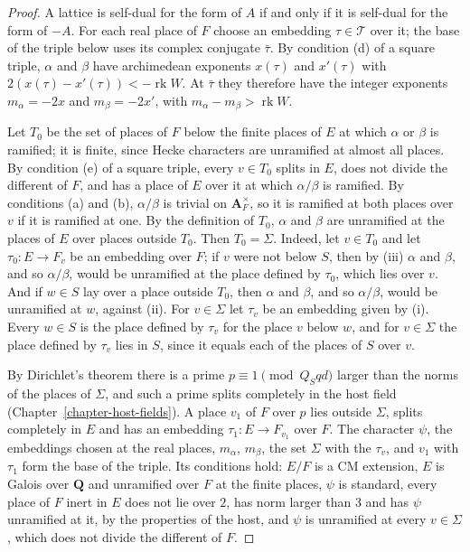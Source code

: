 \begin{proof}
A lattice is self-dual for the form of $A$ if and only if it is self-dual for
the form of $-A$. For each real place of $F$ choose an embedding
$\tau\in\mathcal T$ over it; the base of the triple below uses its complex
conjugate $\bar\tau$. By condition (d) of a square triple, $\alpha$ and $\beta$
have archimedean exponents $x(\tau)$ and $x'(\tau)$ with
$2(x(\tau)-x'(\tau))<-\operatorname{rk}W$. At $\bar\tau$ they therefore have
the integer exponents $m_\alpha=-2x$ and $m_\beta=-2x'$, with
$m_\alpha-m_\beta>\operatorname{rk}W$.

Let $T_0$ be the set of places of $F$ below the finite places of $E$ at which
$\alpha$ or $\beta$ is ramified; it is finite, since Hecke characters are
unramified at almost all places. By condition (e) of a square triple, every
$v\in T_0$ splits in $E$, does not divide the different of $F$, and has a
place of $E$ over it at which $\alpha/\beta$ is ramified. By conditions (a) and
(b), $\alpha/\beta$ is trivial on $\mathbf A_F^\times$, so it is ramified at
both places over $v$ if it is ramified at one. By the definition of $T_0$,
$\alpha$ and $\beta$ are unramified at the places of $E$ over places outside
$T_0$. Then $T_0=\Sigma$. Indeed, let $v\in T_0$ and let $\tau_0\colon E\to F_v$
be an embedding over $F$; if $v$ were not below $S$, then by (iii) $\alpha$ and
$\beta$, and so $\alpha/\beta$, would be unramified at the place defined by
$\tau_0$, which lies over $v$. And if $w\in S$ lay over a place outside $T_0$,
then $\alpha$ and $\beta$, and so $\alpha/\beta$, would be unramified at $w$,
against (ii). For $v\in\Sigma$ let $\tau_v$ be an embedding given by (i). Every
$w\in S$ is the place defined by $\tau_v$ for the place $v$ below $w$, and for
$v\in\Sigma$ the place defined by $\tau_v$ lies in $S$, since it equals each of
the places of $S$ over $v$.

By Dirichlet's theorem there is a prime $p\equiv1\pmod{Q_Sqd}$ larger than the
norms of the places of $\Sigma$, and such a prime splits completely in the host
field (Chapter~\ref{chapter-host-fields}). A place $v_1$ of $F$ over $p$ lies
outside $\Sigma$, splits completely in $E$ and has an embedding
$\tau_1\colon E\to F_{v_1}$ over $F$. The character $\psi$, the embeddings
chosen at the real places, $m_\alpha$, $m_\beta$, the set $\Sigma$ with the
$\tau_v$, and $v_1$ with $\tau_1$ form the base of the triple. Its conditions
hold: $E/F$ is a CM extension, $E$ is Galois over $\mathbf Q$ and unramified
over $F$ at the finite places, $\psi$ is standard, every place of $F$ inert in
$E$ does not lie over $2$, has norm larger than $3$ and has $\psi$ unramified
at it, by the properties of the host, and $\psi$ is unramified at every
$v\in\Sigma$, which does not divide the different of $F$.


\end{proof}
